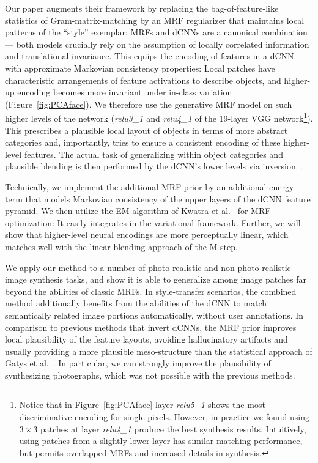 \documentclass[10pt,twocolumn,letterpaper]{article}
\begin{document}
Our paper augments their framework by replacing the bag-of-feature-like statistics of Gram-matrix-matching by an MRF regularizer that maintains local patterns of the ``style'' exemplar: MRFs and dCNNs are a canonical combination --- both models crucially rely on the assumption of locally correlated information and translational invariance. This equips the encoding of features in a dCNN with approximate Markovian consistency properties: Local patches have characteristic arrangements of feature activations to describe objects, and higher-up encoding becomes more invariant under in-class variation (Figure~\ref{fig:PCAface}).
We therefore use the generative MRF model on such higher levels of the network (\textit{relu3\_1} and \textit{relu4\_1} of the 19-layer VGG network\footnote{Notice that in Figure~\ref{fig:PCAface} layer \textit{relu5\_1} shows the most discriminative encoding for single pixels. However, in practice we found using $3 \times 3$ patches at layer \textit{relu4\_1} produce the best synthesis results. Intuitively, using patches from a slightly lower layer has similar matching performance, but permits overlapped MRFs and increased details in synthesis.}). This prescribes a plausible local layout of objects in terms of more abstract categories and, importantly, tries to ensure a consistent encoding of these higher-level features. The actual task of generalizing within object categories and plausible blending is then performed by the dCNN's lower levels via inversion~\cite{Mahendran15}.

Technically, we implement the additional MRF prior by an additional energy term that models Markovian consistency of the upper layers of the dCNN feature pyramid. We then utilize the EM algorithm of Kwatra et al.~\cite{Kwatra05} for MRF optimization: It easily integrates in the variational framework. Further, we will show that higher-level neural encodings are more perceptually linear, which matches well with the linear blending approach of the M-step.

We apply our method to a number of photo-realistic and non-photo-realistic image synthesis tasks, and show it is able to generalize among image patches far beyond the abilities of classic MRFs. In style-transfer scenarios, the combined method additionally benefits from the abilities of the dCNN to match semantically related image portions automatically, without user annotations. In comparison to previous methods that invert dCNNs, the MRF prior improves local plausibility of the feature layouts, avoiding hallucinatory artifacts and usually providing a more plausible meso-structure than the statistical approach of Gatys et al.~\cite{Gatys15}. In particular, we can strongly improve the plausibility of synthesizing photographs, which was not possible with the previous methods.
\end{document}
